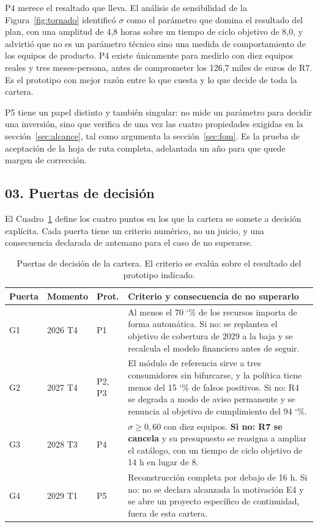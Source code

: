 \documentclass[11pt,letterpaper]{article}
\newcommand{\pct}{\char`\%}  %
\newcommand{\subsec}[1]{%
  \subsection*{#1}%
  \phantomsection\addcontentsline{toc}{subsection}{#1}}
\begin{document}
P4 merece el resaltado que lleva. El análisis de sensibilidad de la
Figura~\ref{fig:tornado} identificó $\sigma$ como el parámetro que domina el
resultado del plan, con una amplitud de 4,8 horas sobre un tiempo de ciclo
objetivo de 8,0, y advirtió que no es un parámetro técnico sino una medida de
comportamiento de los equipos de producto. P4 existe únicamente para medirlo
con diez equipos reales y tres meses-persona, antes de comprometer los 126,7
miles de euros de R7. Es el prototipo con mejor razón entre lo que cuesta y lo
que decide de toda la cartera.

P5 tiene un papel distinto y también singular: no mide un parámetro para
decidir una inversión, sino que verifica de una vez las cuatro propiedades
exigidas en la sección~\ref{sec:alcance}, tal como argumenta la
sección~\ref{sec:fom}. Es la prueba de aceptación de la hoja de ruta completa,
adelantada un año para que quede margen de corrección.

\subsec{03. Puertas de decisión}

El Cuadro~\ref{tab:puertas} define los cuatro puntos en los que la cartera se
somete a decisión explícita. Cada puerta tiene un criterio numérico, no un
juicio, y una consecuencia declarada de antemano para el caso de no
superarse.

\begin{table}[htbp]
  \centering
  \footnotesize
  \setlength{\tabcolsep}{4pt}
  \caption{Puertas de decisión de la cartera. El criterio se evalúa sobre el
  resultado del prototipo indicado.}
  \label{tab:puertas}
  \begin{tabularx}{\textwidth}{@{}lll>{\raggedright\arraybackslash}X@{}}
    \toprule
    \textbf{Puerta} & \textbf{Momento} & \textbf{Prot.} &
      \textbf{Criterio y consecuencia de no superarlo} \\
    \midrule
    G1 & 2026 T4 & P1 & Al menos el 70 \pct{} de los recursos importa de forma
      automática. Si no: se replantea el objetivo de cobertura de 2029 a la
      baja y se recalcula el modelo financiero antes de seguir. \\
    G2 & 2027 T4 & P2, P3 & El módulo de referencia sirve a tres consumidores
      sin bifurcarse, y la política tiene menos del 15 \pct{} de falsos
      positivos. Si no: R4 se degrada a modo de aviso permanente y se
      renuncia al objetivo de cumplimiento del 94 \pct. \\
    G3 & 2028 T3 & P4 & $\sigma \geq 0{,}60$ con diez equipos. \textbf{Si no:
      R7 se cancela} y su presupuesto se reasigna a ampliar el catálogo, con
      un tiempo de ciclo objetivo de 14 h en lugar de 8. \\
    G4 & 2029 T1 & P5 & Reconstrucción completa por debajo de 16 h. Si no: no
      se declara alcanzada la motivación E4 y se abre un proyecto específico
      de continuidad, fuera de esta cartera. \\
    \bottomrule
  \end{tabularx}
\end{table}
\end{document}
